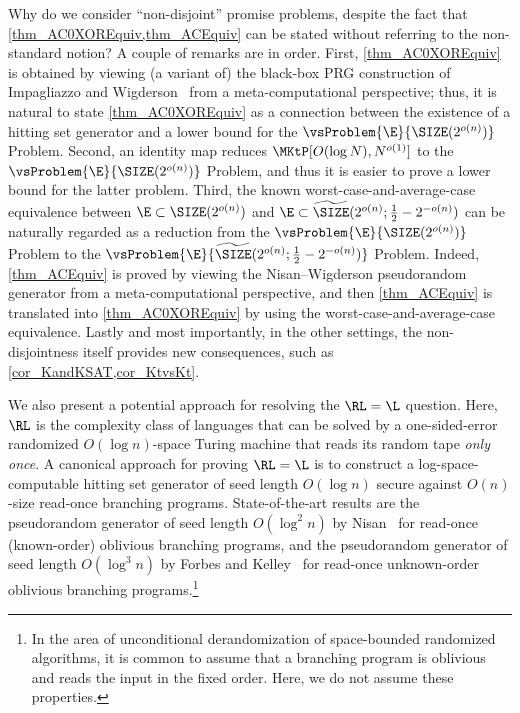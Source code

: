 \documentclass{toc}
\begin{document}
Why do we consider ``non-disjoint'' promise problems,
despite the fact that \cref{thm_AC0XOREquiv,thm_ACEquiv} can be stated
without referring to the non-standard notion?
A couple of remarks are in order.
First,
\cref{thm_AC0XOREquiv} is obtained by viewing (a variant of) the black-box PRG construction of Impagliazzo and Wigderson~\cite{ImpagliazzoW97_stoc_conf}
from a meta-computational perspective; thus, it is natural to state \cref{thm_AC0XOREquiv} as a connection between the existence of a hitting set generator and a lower bound for the $\vsProblem{\E}{\SIZE(2^{o(n)})}$ Problem.
Second,
an identity map reduces
$\MKtP[O(\log N), N^{o(1)}]$
to
the $\vsProblem{\E}{\SIZE(2^{o(n)})}$ Problem,
and thus it is easier to prove a lower bound for the latter problem.
Third,
the known worst-case-and-average-case equivalence between $\E \subset \SIZE(2^{o(n)})$ and $\E \subset \widetilde{\SIZE}(2^{o(n)}; \frac{1}{2} - 2^{-o(n)})$ \cite{SudanTV01_jcss_journals}
can be naturally regarded as a reduction from
the $\vsProblem{\E}{\SIZE(2^{o(n)})}$ Problem
to
the $\vsProblem{\E}{\widetilde{\SIZE}(2^{o(n)}; \frac{1}{2} - 2^{-o(n)})}$ Problem.
Indeed, \cref{thm_ACEquiv} is proved by viewing the Nisan--Wigderson pseudorandom generator from a meta-computational perspective,
and then \cref{thm_ACEquiv} is translated into \cref{thm_AC0XOREquiv}
by using the worst-case-and-average-case equivalence.
Lastly and most importantly,
in the other settings,
the non-disjointness itself provides new consequences, such as \cref{cor_KandKSAT,cor_KtvsKt}.

%



We also present a potential approach for resolving the $\RL = \L$ question.
Here, $\RL$ is the complexity class of languages that can be solved by a one-sided-error randomized $O(\log n)$-space Turing machine
that reads its random tape \emph{only once}.
A canonical approach for proving $\RL = \L$ is to construct a log-space-computable hitting set generator
of seed length $O(\log n)$ secure against $O(n)$-size read-once branching programs.
%
%
%
%
%
%
%
%
%
%
%
%
%
%
%
%
%
%
%
%
State-of-the-art results are the pseudorandom generator of seed length $O(\log^2 n)$ by Nisan~\cite{Nisan92_combinatorica_journals}
for read-once (known-order) oblivious branching programs,
and the pseudorandom generator of seed length $O(\log^3 n)$
by Forbes and Kelley~\cite{ForbesK18_focs_conf}
for read-once unknown-order oblivious branching programs.\footnote{ In the area of unconditional derandomization of space-bounded randomized algorithms, it is common to assume that a branching program is oblivious and reads the input in the fixed order.  Here, we do not assume these properties.  }
\end{document}
